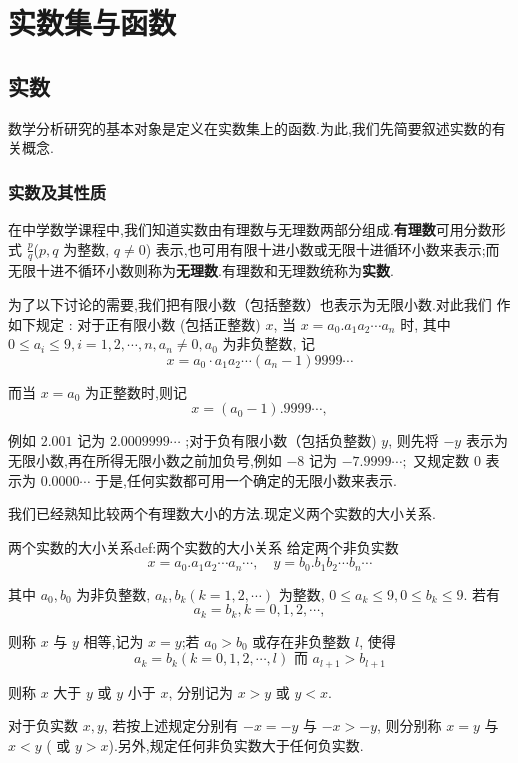 \chapter{实数集与函数}

\section{实数}
数学分析研究的基本对象是定义在实数集上的函数.为此,我们先简要叙述实数的有关概念.

\subsection{实数及其性质}

在中学数学课程中,我们知道实数由有理数与无理数两部分组成.\textbf{有理数}可用分数形式 $\frac{p}{q}$($p, q$ 为整数, $q \neq 0$) 表示,也可用有限十进小数或无限十进循环小数来表示;而无限十进不循环小数则称为\textbf{无理数}.有理数和无理数统称为\textbf{实数}.

为了以下讨论的需要,我们把有限小数（包括整数）也表示为无限小数.对此我们 作如下规定 : 对于正有限小数 (包括正整数) $x$, 当 $x=a_{0} . a_{1} a_{2} \cdots a_{n}$ 时, 其中 $0 \leqslant a_{i} \leqslant 9, i=1,2, \cdots, n, a_{n} \neq 0, a_{0}$ 为非负整数, 记
\[
x=a_{0} \cdot a_{1} a_{2} \cdots\left(a_{n}-1\right) 9999 \cdots
\]

而当 $x=a_{0}$ 为正整数时,则记
\[
x=\left(a_{0}-1\right) .9999 \cdots,
\]

例如 $2.001$ 记为 $2.0009999 \cdots$ ;对于负有限小数（包括负整数) $y$, 则先将 $-y$ 表示为无限小数,再在所得无限小数之前加负号,例如 $-8$ 记为 $-7.9999 \cdots ;$ 又规定数 0 表示为 $0.0000 \cdots$ 于是,任何实数都可用一个确定的无限小数来表示.

我们已经熟知比较两个有理数大小的方法.现定义两个实数的大小关系.

\begin{definition}{两个实数的大小关系}{def:两个实数的大小关系}
	给定两个非负实数
	\[
	x=a_{0} . a_{1} a_{2} \cdots a_{n} \cdots, \quad y=b_{0} . b_{1} b_{2} \cdots b_{n} \cdots
	\]

	其中 $a_{0}, b_{0}$ 为非负整数, $a_{k}, b_{k}(k=1,2, \cdots)$ 为整数, $0 \leqslant a_{k} \leqslant 9,0 \leqslant b_{k} \leqslant 9$. 若有
	\[
	a_{k}=b_{k}, k=0,1,2, \cdots,
	\]

	则称 $x$ 与 $y$ 相等,记为 $x=y$;若 $a_{0}>b_{0}$ 或存在非负整数 $l$, 使得
	\[
	a_{k}=b_{k}(k=0,1,2, \cdots, l) \text { 而 } a_{l+1}>b_{l+1}
	\]

	则称 $x$ 大于 $y$ 或 $y$ 小于 $x$, 分别记为 $x>y$ 或 $y<x$.

	对于负实数 $x, y$, 若按上述规定分别有 $-x=-y$ 与 $-x>-y$, 则分别称 $x=y$ 与 $x<y$ ( 或 $y>x$).另外,规定任何非负实数大于任何负实数.
\end{definition}


